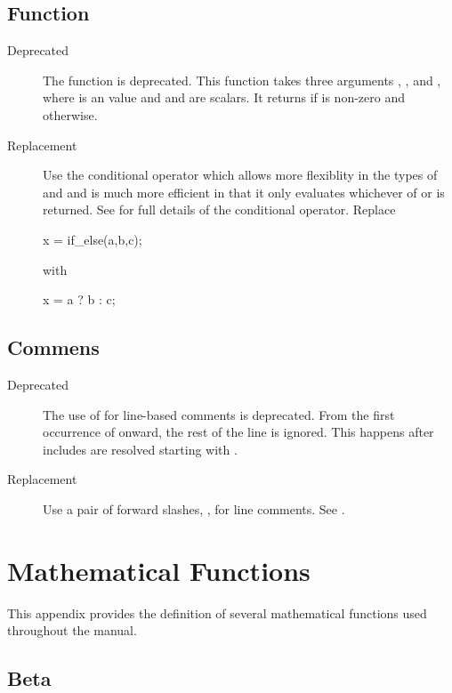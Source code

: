 \section{ Function}

\begin{description}
\item[Deprecated]The function  is deprecated.  This
  function takes three arguments , , and ,
  where  is an  value and  and  are
  scalars. It returns  if  is non-zero and 
  otherwise.
%
\item[Replacement] Use the conditional operator which allows more
  flexiblity in the types of  and  and is much more
  efficient in that it only evaluates whichever of  or
   is returned.  See  for
  full details of the conditional operator.  Replace
\begin{stancode}
x = if_else(a,b,c);
\end{stancode}
 with
\begin{stancode}
x = a ? b : c;
\end{stancode}
\end{description}

\section{\code{\#} Commens}

\begin{description}
\item[Deprecated] The use of \code{\#} for line-based comments is
  deprecated.  From the first occurrence of \code{\#} onward, the rest
  of the line is ignored.  This happens after includes are resolved
  starting with .
\item[Replacement] Use a pair of forward slashes, \code{//}, for line
  comments.  See .
\end{description}


\chapter{Mathematical Functions}\label{math-functions.appendix}

This appendix provides the definition of several mathematical
functions used throughout the manual.

\section{Beta}\label{beta-appendix.section}

